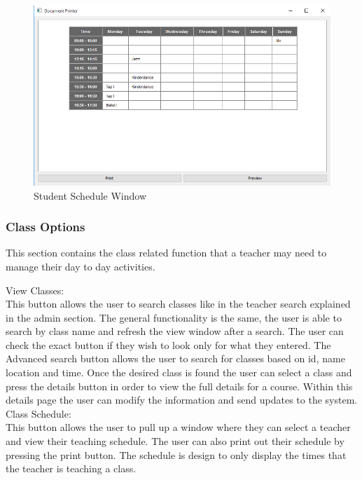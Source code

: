 \begin{figure}
  \includegraphics[width=\linewidth]{pics/userGuide/studentSchedule.png}
  \caption{Student Schedule Window}
  \label{fig:User doc: Student Schedule}
\end{figure}


\subsubsection{Class Options}
This section contains the class related function that a teacher may need to manage their day to day activities.

View Classes:\\
This button allows the user to search classes like in the teacher search explained in the admin section. The general functionality is the same, the user is able to search by class name and refresh the view window after a search. The user can check the exact button if they wish to look only for what they entered. The Advanced search button allows the user to search for classes based on id, name location and time. Once the desired class is found the user can select a class and press the details button in order to view the full details for a course. Within this details page the user can modify the information and send updates to the system.\\


Class Schedule:\\
This button allows the user to pull up a window where they can select a teacher and view their teaching schedule. The user can also print out their schedule by pressing the print button. The schedule is design to only display the times that the teacher is teaching a class.\\

